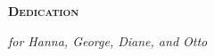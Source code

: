 \newpage 

\begin{flushleft}
	\Huge \textsc{\textbf{Dedication}}

\end{flushleft}
\vspace*{8cm}
\begin{flushright}
   \emph{for Hanna, George, Diane, and Otto}
\end{flushright}
 
